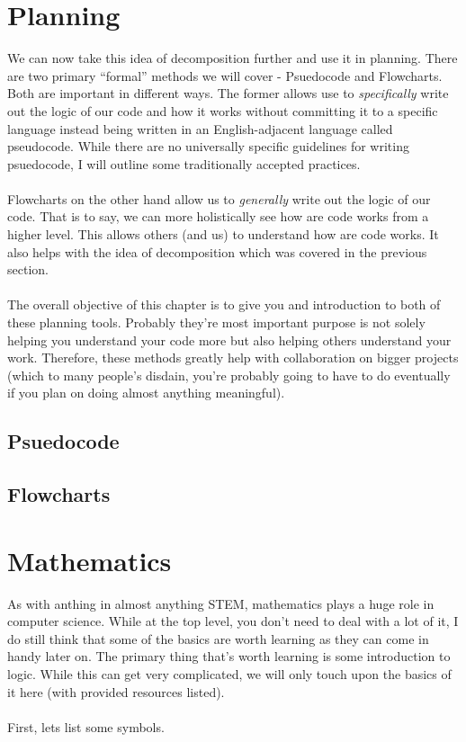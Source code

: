\documentclass[12pt,a4paper]{book}
\begin{document}
		\section{Planning}
			We can now take this idea of decomposition further and use it in planning. There are two primary ``formal'' methods we will cover - Psuedocode and Flowcharts. Both are important in different ways. The former allows use to \textit{specifically} write out the logic of our code and how it works without committing it to a specific language instead being written in an English-adjacent language called pseudocode. While there are no universally specific guidelines for writing psuedocode, I will outline some traditionally accepted practices.
			\\\\
			Flowcharts on the other hand allow us to \textit{generally} write out the logic of our code. That is to say, we can more holistically see how are code works from a higher level. This allows others (and us) to understand how are code works. It also helps with the idea of decomposition which was covered in the previous section.
			\\\\
			The overall objective of this chapter is to give you and introduction to both of these planning tools. Probably they're most important purpose is not solely helping you understand your code more but also helping others understand your work. Therefore, these methods greatly help with collaboration on bigger projects (which to many people's disdain, you're probably going to have to do eventually if you plan on doing almost anything meaningful).
			
			\subsection{Psuedocode} \label{sec:psuedocode}
			
			\subsection{Flowcharts} \label{sec:flowchart}
				
		\section{Mathematics}
			As with anthing in almost anything STEM, mathematics plays a huge role in computer science. While at the top level, you don't need to deal with a lot of it, I do still think that some of the basics are worth learning as they can come in handy later on. The primary thing that's worth learning is some introduction to logic. While this can get very complicated, we will only touch upon the basics of it here (with provided resources listed). \\
			\\
			First, lets list some symbols. 
\end{document}
